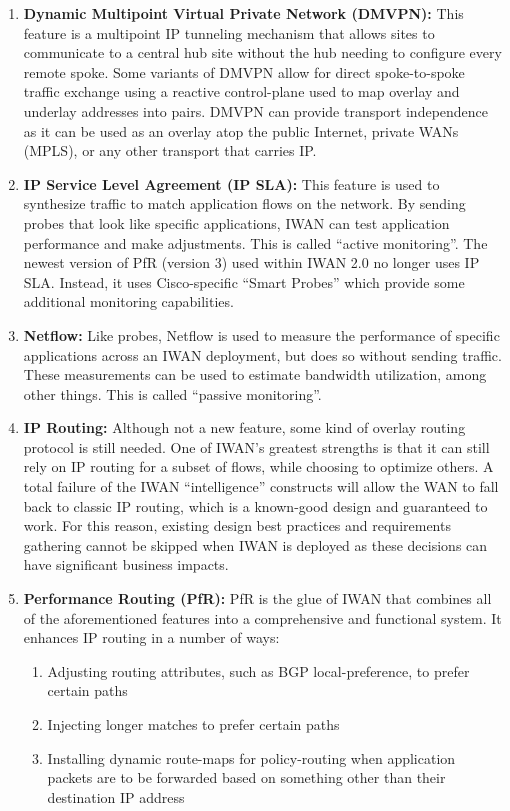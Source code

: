 \begin{enumerate}
  \item \textbf{Dynamic Multipoint Virtual Private Network (DMVPN):} This
  feature is a multipoint IP tunneling mechanism that allows sites to
  communicate to a central hub site without the hub needing to configure every
  remote spoke. Some variants of DMVPN allow for direct spoke-to-spoke traffic
  exchange using a reactive control-plane used to map overlay and underlay
  addresses into pairs. DMVPN can provide transport independence as it can be
  used as an overlay atop the public Internet, private WANs (MPLS), or any
  other transport that carries IP\@.
  \item \textbf{IP Service Level Agreement (IP SLA):} This feature is used to
  synthesize traffic to match application flows on the network. By sending
  probes that look like specific applications, IWAN can test application
  performance and make adjustments. This is called ``active monitoring''. The
  newest version of PfR (version 3) used within IWAN 2.0 no longer uses IP
  SLA\@. Instead, it uses Cisco-specific ``Smart Probes'' which provide some
  additional monitoring capabilities.
  \item \textbf{Netflow:} Like probes, Netflow is used to measure the
  performance of specific applications across an IWAN deployment, but does so
  without sending traffic. These measurements can be used to estimate
  bandwidth utilization, among other things. This is called ``passive monitoring''.
  \item \textbf{IP Routing:} Although not a new feature, some kind of overlay
  routing protocol is still needed. One of IWAN’s greatest strengths is that
  it can still rely on IP routing for a subset of flows, while choosing to
  optimize others. A total failure of the IWAN ``intelligence'' constructs
  will allow the WAN to fall back to classic IP routing, which is a known-good
  design and guaranteed to work. For this reason, existing design best
  practices and requirements gathering cannot be skipped when IWAN is deployed
  as these decisions can have significant business impacts.
  \item \textbf{Performance Routing (PfR):} PfR is the glue of IWAN that
  combines all of the aforementioned features into a comprehensive and
  functional system. It enhances IP routing in a number of ways:

  \begin{enumerate}
    \item Adjusting routing attributes, such as BGP local-preference, to
	prefer certain paths
    \item Injecting longer matches to prefer certain paths
    \item Installing dynamic route-maps for policy-routing when application
	packets are to be forwarded based on something other than their destination IP address
  \end{enumerate}

\end{enumerate}

